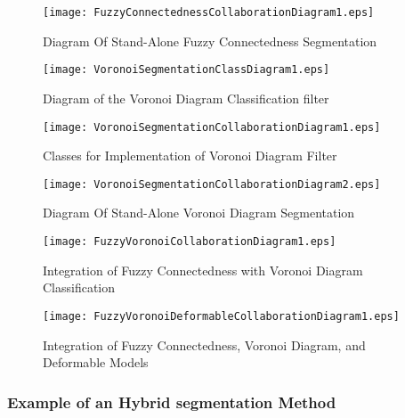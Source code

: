 \begin{figure}
\center
\texttt{[image: FuzzyConnectednessCollaborationDiagram1.eps]}
\caption{Diagram Of Stand-Alone Fuzzy Connectedness Segmentation}
\label{fig:UMLCollaborationDiagramoftherFuzzyConnectednessFilter}
\end{figure}

\begin{figure}
\center
\texttt{[image: VoronoiSegmentationClassDiagram1.eps]}
\caption{Diagram of the Voronoi Diagram Classification filter}
\label{fig:UMLVoronoiSegmentationClassFilter}
\end{figure}

\begin{figure}
\center
\texttt{[image: VoronoiSegmentationCollaborationDiagram1.eps]}
\caption{Classes for Implementation of Voronoi Diagram Filter}
\label{fig:UMLClassesforImplementationofVoronoiDiagramFilter}
\end{figure}


\begin{figure}
\center
\texttt{[image: VoronoiSegmentationCollaborationDiagram2.eps]}
\caption{Diagram Of Stand-Alone Voronoi Diagram Segmentation}
\label{fig:UMLCollaborationDiagramoftheVoronoiSegmentationFilter}
\end{figure}


\begin{figure}
\center
\texttt{[image: FuzzyVoronoiCollaborationDiagram1.eps]}
\caption{Integration of Fuzzy Connectedness with Voronoi Diagram Classification}
\label{fig:UMLHybridMethodDiagram1}
\end{figure}

\begin{figure}
\center
\texttt{[image: FuzzyVoronoiDeformableCollaborationDiagram1.eps]}
\caption{Integration of Fuzzy Connectedness, Voronoi Diagram, and Deformable Models}
\label{fig:UMLHybridMethodDiagram2}
\end{figure}



\subsubsection{Example of an Hybrid segmentation Method}
\label{sec:HybridMethod1:Example}

\ifitkFullVersion

\fi



